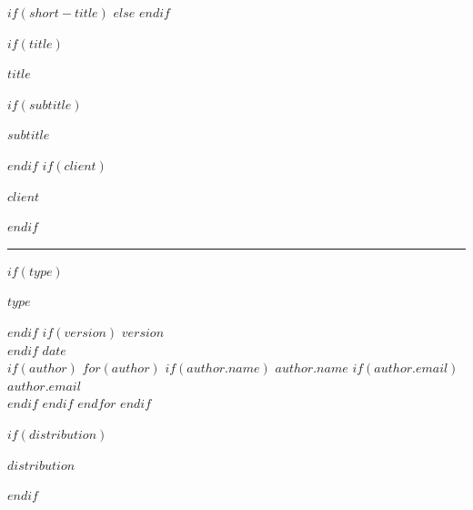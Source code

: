 \documentclass[
    $if(fontsize)$$fontsize$$else$10pt$endif$,
    $if(papersize)$$papersize$$else$letterpaper$endif$,
    titlepage,
    oneside,
    openright,
    $if(is_draft)$draft$else$final$endif$,
    article]{memoir}
\begin{document}
$if(short-title)$
    \ifpdf
    \fi
$else$
    \ifpdf
    \fi
$endif$

%
$if(title)$
    \newlength{\centeroffset}
    \thispagestyle{empty}
    \vspace*{1.5in}
    \begin{flushright}
        {
            {\fontsize{20pt}{26pt}$title$\par}
            $if(subtitle)$
                \vspace*{-3pt}
                {\fontsize{18pt}{24pt}$subtitle$\par}
            $endif$
            $if(client)$

                {\fontsize{16pt}{20pt}$client$\par}
            $endif$
        }

        \noindent\textcolor{Grey50}{\rule[$beforetitlerule$]{\textwidth}{1pt}}

        \vspace{$aftertitlerule$}
        $if(type)$
            \vspace*{-0.25em}
            {\fontsize{16pt}{20pt}$type$\par}
        $endif$
        $if(version)$
            {\fontsize{12pt}{14.4pt}
                \space $version$\\[0.05in]
            }
        $endif$
        {\fontsize{12pt}{14pt}$date$}\\[0.05in]

        \vspace{2.5in}
        $if(author)$
            $for(author)$
                $if(author.name)$
                    {\fontsize{12pt}{14pt}$author.name$}
                    $if(author.email)$
                        {\\\fontsize{12pt}{14pt}$author.email$\\[0.2in]}
                    $endif$
                $endif$
            $endfor$
        $endif$

        \vspace*{\fill}
        $if(distribution)$
            {\fontsize{10pt}{13pt}$distribution$\par}
        $endif$
    \end{flushright}
\end{document}
